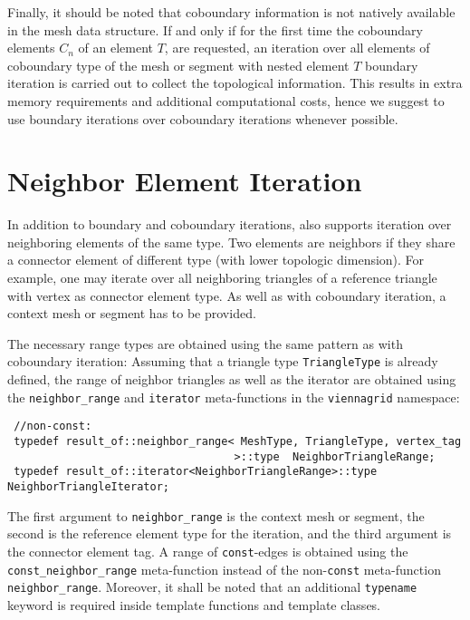 Finally, it should be noted that coboundary information is not natively available in the mesh data structure.
If and only if for the first time the coboundary elements $C_n$ of an element $T$, are requested, an iteration over all elements of coboundary type of the mesh or segment with nested element $T$ boundary iteration is carried out to collect the topological information.
This results in extra memory requirements and additional computational costs, hence we suggest to use boundary iterations over coboundary iterations whenever possible.



\section{Neighbor Element Iteration}
In addition to boundary and coboundary iterations, {\ViennaGridversion} also supports iteration over neighboring elements of the same type.
Two elements are neighbors if they share a connector element of different type (with lower topologic dimension).
For example, one may iterate over all neighboring triangles of a reference triangle with vertex as connector element type.
As well as with coboundary iteration, a context mesh or segment has to be provided.


The necessary range types are obtained using the same pattern as with coboundary iteration:
Assuming that a triangle type \lstinline|TriangleType| is already defined, the range of neighbor triangles as well as the iterator are obtained
using the \lstinline|neighbor_range| and \lstinline|iterator| meta-functions in the \lstinline|viennagrid| namespace:
\begin{lstlisting}
 //non-const:
 typedef result_of::neighbor_range< MeshType, TriangleType, vertex_tag
                                   >::type  NeighborTriangleRange;
 typedef result_of::iterator<NeighborTriangleRange>::type   NeighborTriangleIterator;
\end{lstlisting}
The first argument to \lstinline|neighbor_range| is the context mesh or segment, the second is the reference element type for the iteration, and the third argument is the connector element tag.
A range of \lstinline|const|-edges is obtained using the \lstinline|const_neighbor_range| meta-function instead of the non-\lstinline|const| meta-function \lstinline|neighbor_range|.
Moreover, it shall be noted that an additional \lstinline|typename| keyword is required inside template functions and template classes.

